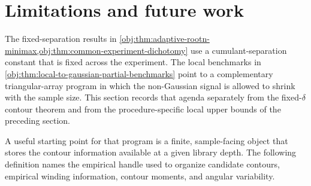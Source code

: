 \section{Limitations and future work}

The fixed-separation results in \cref{obj:thm:adaptive-rootn-minimax,obj:thm:common-experiment-dichotomy} use a cumulant-separation constant that is fixed across the experiment. The local benchmarks in \cref{obj:thm:local-to-gaussian-partial-benchmarks} point to a complementary triangular-array program in which the non-Gaussian signal is allowed to shrink with the sample size. This section records that agenda separately from the fixed-\(\delta\) contour theorem and from the procedure-specific local upper bounds of the preceding section.

A useful starting point for that program is a finite, sample-facing object that stores the contour information available at a given library depth. The following definition names the empirical handle used to organize candidate contours, empirical winding information, contour moments, and angular variability.

